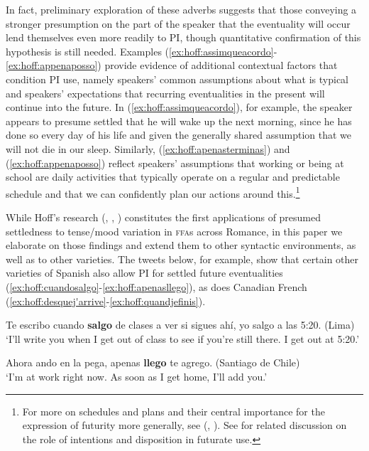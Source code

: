 \documentclass[output=paper,colorlinks,citecolor=brown]{langscibook}
\begin{document}
In fact, preliminary exploration of these adverbs suggests that those conveying a stronger presumption on the part of the speaker that the eventuality will occur lend themselves even more readily to PI, though quantitative confirmation of this hypothesis is still needed. Examples (\ref{ex:hoff:assimqueacordo}-\ref{ex:hoff:appenaposso}) provide evidence of additional contextual factors that condition PI use, namely speakers’ common assumptions about what is typical and speakers’ expectations that recurring eventualities in the present will continue into the future. In (\ref{ex:hoff:assimqueacordo}), for example, the speaker appears to presume settled that he will wake up the next morning, since he has done so every day of his life and given the generally shared assumption that we will not die in our sleep. Similarly, (\ref{ex:hoff:apenasterminas}) and (\ref{ex:hoff:appenaposso}) reflect speakers' assumptions that working or being at school are daily activities that typically operate on a regular and predictable schedule and that we can confidently plan our actions around this.\footnote{For more on schedules and plans and their central importance for the expression of futurity more generally, see \citeauthor{Copley2002} (\citeyear{Copley2002}, \citeyear{Copley2008}). See \citet{Copley2018} for  related discussion on the role of intentions and disposition in futurate use.}

While Hoff’s research (\citeyear{Hoff2019}, \citeyear{Hoff2020}, \citeyear{HoffForthcoming}) constitutes the first applications of presumed settledness to tense/mood variation in \textsc{ffa}s across Romance, in this paper we elaborate on those findings and extend them to other syntactic environments, as well as to other varieties. The tweets below, for example, show that certain other varieties of Spanish also allow PI for settled future eventualities (\ref{ex:hoff:cuandosalgo}-\ref{ex:hoff:apenasllego}), as does Canadian French (\ref{ex:hoff:desquej'arrive}-\ref{ex:hoff:quandjefinis}). 

\begin{exe}
\ex\label{ex:hoff:cuandosalgo} Te escribo cuando \textbf{salgo} de clases a ver si sigues ahí, yo salgo a las 5:20. (Lima)\\
`I’ll write you when I get out of class to see if you’re still there. I get out at 5:20.'
\end{exe}

\begin{exe}
\ex\label{ex:hoff:apenasllego} Ahora ando en la pega, apenas \textbf{llego} te agrego. (Santiago de Chile)\\
`I’m at work right now. As soon as I get home, I’ll add you.'
\end{exe}
\end{document}
